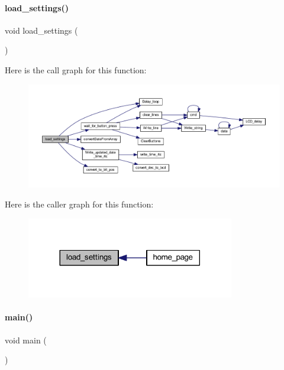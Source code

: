 \paragraph{load\+\_\+settings()}
{\footnotesize\ttfamily void load\+\_\+settings (\begin{DoxyParamCaption}{ }\end{DoxyParamCaption})}

Here is the call graph for this function\+:
\nopagebreak
\begin{figure}[H]
\begin{center}
\leavevmode
\includegraphics[width=350pt]{a00038_a457486e8b8211e75970f756106ebff2c_cgraph}
\end{center}
\end{figure}
Here is the caller graph for this function\+:
\nopagebreak
\begin{figure}[H]
\begin{center}
\leavevmode
\includegraphics[width=257pt]{a00038_a457486e8b8211e75970f756106ebff2c_icgraph}
\end{center}
\end{figure}
\mbox{\label{a00038_acdef7a1fd863a6d3770c1268cb06add3}} 
\paragraph{main()}
{\footnotesize\ttfamily void main (\begin{DoxyParamCaption}{ }\end{DoxyParamCaption})}


